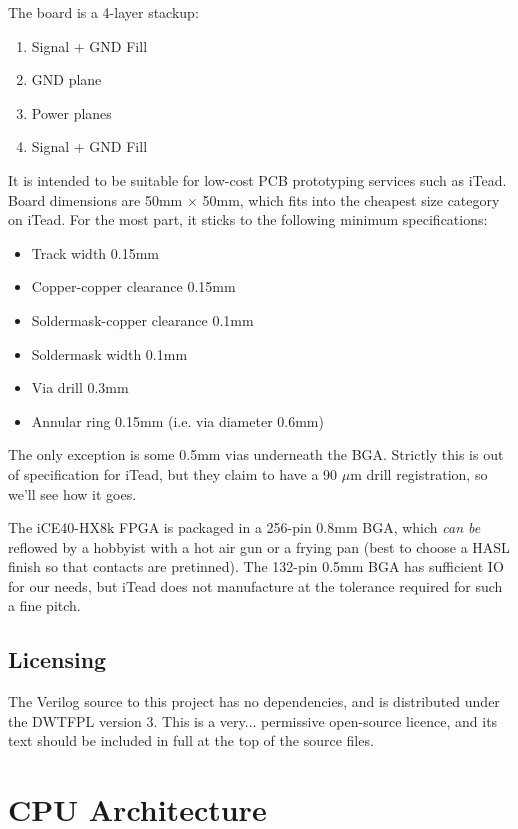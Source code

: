 \documentclass{article}
\begin{document}
The board is a 4-layer stackup:

\begin{enumerate}
\item Signal + GND Fill
\item GND plane
\item Power planes
\item Signal + GND Fill
\end{enumerate}

It is intended to be suitable for low-cost PCB prototyping services such as iTead. Board dimensions are 50mm $\times$ 50mm, which fits into the cheapest size category on iTead. For the most part, it sticks to the following minimum specifications:

\begin{itemize}
\item Track width 0.15mm
\item Copper-copper clearance 0.15mm
\item Soldermask-copper clearance 0.1mm
\item Soldermask width 0.1mm
\item Via drill 0.3mm
\item Annular ring 0.15mm (i.e. via diameter 0.6mm)
\end{itemize}

The only exception is some 0.5mm vias underneath the BGA. Strictly this is out of specification for iTead, but they claim to have a 90 $\mu$m drill registration, so we'll see how it goes.

The iCE40-HX8k FPGA is packaged in a 256-pin 0.8mm BGA, which \textit{can be} reflowed by a hobbyist with a hot air gun or a frying pan (best to choose a HASL finish so that contacts are pretinned). The 132-pin 0.5mm BGA has sufficient IO for our needs, but iTead does not manufacture at the tolerance required for such a fine pitch.


\subsection{Licensing}

The Verilog source to this project has no dependencies, and is distributed under the DWTFPL version 3. This is a very... permissive open-source licence, and its text should be included in full at the top of the source files.


\section{CPU Architecture}
\end{document}
